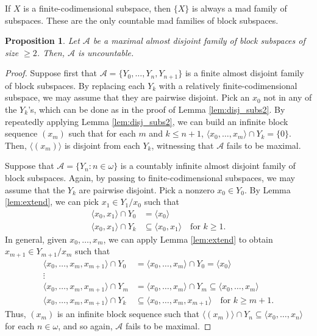 \documentclass[11pt]{amsart}
\newcommand{\LA}{\mathcal{A}}
\newtheorem{prop}[thm]{Proposition}
\theoremstyle{definition}
\theoremstyle{remark}
\renewcommand{\1}{\mathbf{1}}
\begin{document}
If $X$ is a finite-codimensional subspace, then $\{X\}$ is always a mad family of subspaces. These are the only countable mad families of block subspaces.%

\begin{prop}\label{prop:mad_unctbl}
	Let $\LA$ be a maximal almost disjoint family of block subspaces of size $\geq 2$. Then, $\LA$ is uncountable.%
\end{prop}

\begin{proof}
	Suppose first that $\LA=\{Y_0,\ldots,Y_n,Y_{n+1}\}$ is a finite almost disjoint family of block subspaces. By replacing each $Y_k$ with a relatively finite-codimensional subspace, we may assume that they are pairwise disjoint. Pick an $x_0$ not in any of the $Y_k$'s, which can be done as in the proof of Lemma \ref{lem:disj_subs2}. By repeatedly applying Lemma \ref{lem:disj_subs2}, we can build an infinite block sequence $(x_m)$ such that for each $m$ and $k\leq n+1$, $\langle x_0,\ldots,x_m\rangle\cap Y_k=\{0\}$. Then, $\langle (x_m)\rangle$ is disjoint from each $Y_k$, witnessing that $\LA$ fails to be maximal.
	
	Suppose that $\LA=\{Y_n:n\in\omega\}$ is a countably infinite almost disjoint family of block subspaces. Again, by passing to finite-codimensional subspaces, we may assume that the $Y_k$ are pairwise disjoint. Pick a nonzero $x_0\in Y_0$. By Lemma \ref{lem:extend}, we can pick $x_1\in Y_1/x_0$ such that
	\begin{align*}
		\langle x_0,x_1\rangle \cap Y_0&=\langle x_0\rangle\\
		\langle x_0,x_1\rangle \cap Y_k&\subseteq \langle x_0,x_1\rangle \quad\text{for $k\geq 1$}.
	\end{align*}
	In general, given $x_0,\ldots, x_m$, we can apply Lemma \ref{lem:extend} to obtain $x_{m+1}\in Y_{m+1}/x_m$ such that
	 \begin{align*}
		\langle x_0,\ldots,x_m,x_{m+1}\rangle \cap Y_0&=	\langle x_0,\ldots,x_m\rangle \cap Y_0=\langle x_0\rangle\\
		\vdots\\
		\langle x_0,\ldots,x_m,x_{m+1}\rangle \cap Y_m &= \langle x_0,\ldots,x_m\rangle \cap Y_m\subseteq\langle x_0,\ldots,x_m\rangle\\
		\langle x_0,\ldots,x_m,x_{m+1}\rangle \cap Y_k&\subseteq \langle x_0,\ldots,x_m,x_{m+1}\rangle \quad\text{for $k\geq m+1$}.
	 \end{align*}
	Thus, $(x_m)$ is an infinite block sequence such that $\langle(x_m)\rangle\cap Y_n\subseteq\langle x_0,\ldots,x_n\rangle$ for each $n\in\omega$, and so again, $\LA$ fails to be maximal.
\end{proof}
\end{document}
